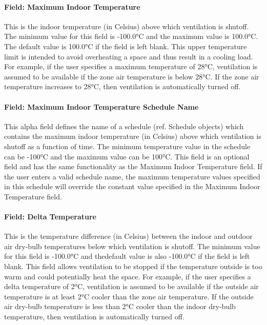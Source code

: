 \paragraph{Field: Maximum Indoor Temperature}\label{field-maximum-indoor-temperature}

This is the indoor temperature (in Celsius) above which ventilation is shutoff. The minimum value for this field is -100.0°C and the maximum value is 100.0°C. The default value is 100.0°C if the field is left blank. This upper temperature limit is intended to avoid overheating a space and thus result in a cooling load. For example, if the user specifies a maximum temperature of 28°C, ventilation is assumed to be available if the zone air temperature is below 28°C. If the zone air temperature increases to 28°C, then ventilation is automatically turned off.

\paragraph{Field: Maximum Indoor Temperature Schedule Name}\label{field-maximum-indoor-temperature-schedule-name}

This alpha field defines the name of a schedule (ref. Schedule objects) which contains the maximum indoor temperature (in Celsius) above which ventilation is shutoff as a function of time. The minimum temperature value in the schedule can be -100°C and the maximum value can be 100°C. This field is an optional field and has the same functionality as the Maximum Indoor Temperature field. If the user enters a valid schedule name, the maximum temperature values specified in this schedule will override the constant value specified in the Maximum Indoor Temperature field.

\paragraph{Field: Delta Temperature}\label{field-delta-temperature}

This is the temperature difference (in Celsius) between the indoor and outdoor air dry-bulb temperatures below which ventilation is shutoff. The minimum value for this field is -100.0°C and thedefault value is also -100.0°C if the field is left blank. This field allows ventilation to be stopped if the temperature outside is too warm and could potentially heat the space. For example, if the user specifies a delta temperature of 2°C, ventilation is assumed to be available if the outside air temperature is at least 2°C cooler than the zone air temperature. If the outside air dry-bulb temperature is less than 2°C cooler than the indoor dry-bulb temperature, then ventilation is automatically turned off.

